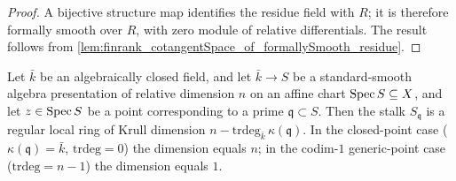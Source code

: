 \begin{proof}
  A bijective structure map identifies the residue field with \(R\); it is
  therefore formally smooth over \(R\), with zero module of relative
  differentials.  The result follows from
  \cref{lem:finrank_cotangentSpace_of_formallySmooth_residue}.
\end{proof}

\begin{lemma}
  \label{lem:stage6_regular_stalk_assembly}
  Let \(\bar k\) be an algebraically closed field, and let
  \(\bar k \to S\) be a standard-smooth algebra presentation of
  relative dimension \(n\) on an affine chart \(\operatorname{Spec} S \subseteq X\),
  and let \(z \in \operatorname{Spec} S\) be a point corresponding to a prime
  \(\mathfrak q \subset S\). Then the stalk \(S_{\mathfrak q}\) is a
  regular local ring of Krull dimension
  \(n - \mathrm{trdeg}_{\bar k}\,\kappa(\mathfrak q)\). In the
  closed-point case (\(\kappa(\mathfrak q) = \bar k\),
  \(\mathrm{trdeg} = 0\)) the dimension equals \(n\); in the
  codim-\(1\) generic-point case (\(\mathrm{trdeg} = n - 1\)) the
  dimension equals \(1\).
\end{lemma}

